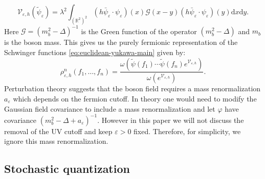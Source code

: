 \documentclass{article}
\newcommand{\mathd}{\mathrm{d}}
\begin{document}
\[ \mathcal{V}_{\varepsilon, h} (\tilde{\psi}_{\varepsilon}) = \lambda^2
   \int_{(\mathbb{R}^2)^2} (h \bar{\psi}_{\varepsilon} \cdot
   \psi_{\varepsilon}) (x) \mathcal{G} (x - y) (h \bar{\psi}_{\varepsilon}
   \cdot \psi_{\varepsilon}) (y) \mathd x \mathd y. \]
Here $\mathcal{G} = (m^2_b - \Delta)^{- 1}$ is the Green function of the
operator $(m^2_b - \Delta)$ and $m_b$ is the boson mass. This gives us the
purely fermionic representation of the Schwinger functions
{\eqref{eq:euclidean-yukawa-main}} given by:
\begin{equation}
  \rho^n_{\varepsilon, h} (f_1, \ldots, f_n) = \frac{\omega (\tilde{\psi}
  (f_1) \cdots \tilde{\psi} (f_n) e^{\mathcal{V}_{\varepsilon, h}})}{\omega
  (e^{\mathcal{V}_{\varepsilon, h}})} . \label{eq:euclidean-yukawa-fermion}
\end{equation}
Perturbation theory suggests that the boson field requires a mass
renormalization $a_{\varepsilon}$ which depends on the fermion cutoff. In
theory one would need to modify the Gaussian field covariance to include a
mass renormalization and let $\varphi$ have covariance $(m^2_b - \Delta +
a_{\varepsilon})^{- 1}$. However in this paper we will not discuss the removal
of the UV cutoff and keep $\varepsilon > 0$ fixed. Therefore, for simplicity,
we ignore this mass renormalization.

\subsection{Stochastic quantization}
\end{document}
